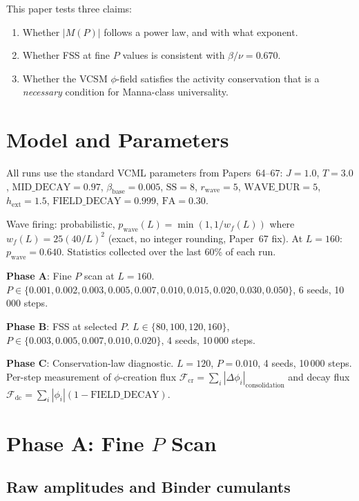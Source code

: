 \documentclass[twocolumn,10pt]{article}
\begin{document}
This paper tests three claims:
\begin{enumerate}
  \item Whether $|M(P)|$ follows a power law, and with what exponent.
  \item Whether FSS at fine $P$ values is consistent with $\beta/\nu = 0.670$.
  \item Whether the VCSM $\phi$-field satisfies the activity conservation that
        is a \emph{necessary} condition for Manna-class universality.
\end{enumerate}

\section{Model and Parameters}

All runs use the standard VCML parameters from Papers~64--67:
$J=1.0$, $T=3.0$, $\text{MID\_DECAY}=0.97$, $\beta_\mathrm{base}=0.005$,
$\text{SS}=8$, $r_\mathrm{wave}=5$, $\text{WAVE\_DUR}=5$,
$h_\mathrm{ext}=1.5$, $\text{FIELD\_DECAY}=0.999$, $\text{FA}=0.30$.

Wave firing: probabilistic, $p_\mathrm{wave}(L) = \min(1, 1/w_f(L))$
where $w_f(L) = 25(40/L)^2$ (exact, no integer rounding, Paper~67 fix).
At $L=160$: $p_\mathrm{wave} = 0.640$.
Statistics collected over the last 60\% of each run.

\textbf{Phase A}: Fine $P$ scan at $L=160$.
$P\in\{0.001, 0.002, 0.003, 0.005, 0.007, 0.010, 0.015, 0.020, 0.030, 0.050\}$,
6 seeds, 10\,000 steps.

\textbf{Phase B}: FSS at selected $P$.
$L\in\{80, 100, 120, 160\}$,
$P\in\{0.003, 0.005, 0.007, 0.010, 0.020\}$,
4 seeds, 10\,000 steps.

\textbf{Phase C}: Conservation-law diagnostic.
$L=120$, $P=0.010$, 4 seeds, 10\,000 steps.
Per-step measurement of $\phi$-creation flux
$\mathcal{F}_\mathrm{cr} = \sum_i |\Delta\phi_i|_\mathrm{consolidation}$
and decay flux
$\mathcal{F}_\mathrm{dc} = \sum_i |\phi_i|(1-\text{FIELD\_DECAY})$.

\section{Phase A: Fine $P$ Scan}

\subsection{Raw amplitudes and Binder cumulants}
\end{document}
